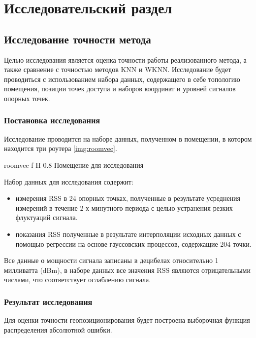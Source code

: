 \chapter{Исследовательский раздел}

\section{Исследование точности метода}

Целью исследования является оценка точности работы реализованного метода, а также сравнение с точностью методов KNN и WKNN. Исследование будет проводиться с использованием набора данных, содержащего в себе топологию помещения, позиции точек доступа и наборов координат и уровней сигналов опорных точек. 

\subsection{Постановка исследования}

Исследование проводится на наборе данных, полученном в помещении, в котором находится три роутера \ref{img:roomvec}.

    {roomvec}
    {f}
    {H}
    {0.8\linewidth}
    {Помещение для исследования}

Набор данных для исследования содержит:
\begin{itemize}[label=---]
    \item измерения RSS в 24 опорных точках, полученные в результате усреднения измерений в течение 2-х минутного периода с целью устранения резких флуктуаций сигнала.
    \item показания RSS полученные в результате интерполяции исходных данных с помощью регрессии на основе гауссовских процессов, содержащие 204 точки.
\end{itemize}

Все данные о мощности сигнала записаны в децибелах относительно 1 милливатта (dBm), в наборе данных все значения RSS являются отрицательными числами, что соответствует ослаблению сигнала.

\subsection{Результат исследования}

Для оценки точности геопозиционирования будет построена выборочная функция распределения абсолютной ошибки.

